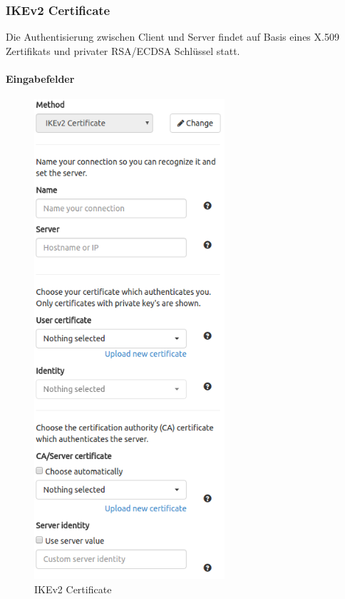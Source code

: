 \subsubsection{IKEv2 Certificate}
Die Authentisierung zwischen Client und Server findet auf Basis eines X.509 Zertifikats und privater RSA/ECDSA Schlüssel statt.\\
\noindent\begin{minipage}[t]{0.5\textwidth}
\vspace{0pt}
\paragraph{Eingabefelder}\mbox{}\medskip
    \begin{figure}[H]
    	\centering
    	\includegraphics[width=200pt]{images/forms/ikev2_certificate.png}
    	\caption{IKEv2 Certificate}
    \end{figure}
\end{minipage}
\hfill
